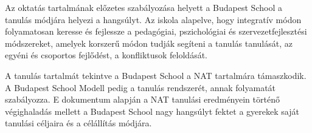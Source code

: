 Az oktatás tartalmának előzetes szabályozása helyett a Budapest School a
tanulás módjára helyezi a hangsúlyt. Az iskola alapelve, hogy integratív
módon folyamatosan keresse és fejlessze a pedagógiai, pszichológiai és
szervezetfejlesztési módszereket, amelyek korszerű módon tudják segíteni
a tanulás tanulását, az egyéni és csoportos fejlődést, a konfliktusok
feloldását.

A tanulás tartalmát tekintve a Budapest School a NAT tartalmára
támaszkodik. A Budapest School Modell pedig a tanulás rendszerét, annak
folyamatát szabályozza. E dokumentum alapján a NAT tanulási eredményein
történő végighaladás mellett a Budapest School nagy hangsúlyt fektet a
gyerekek saját tanulási céljaira és a célállítás módjára.
